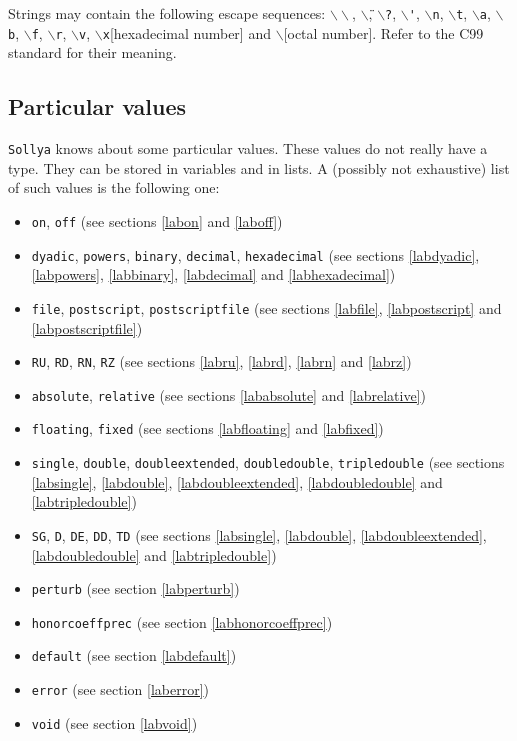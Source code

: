\documentclass[a4paper]{article}
\newcommand{\com}[1]{\texttt{#1}}
\newcommand{\sollya}{\texttt{Sollya}\xspace}
\begin{document}
Strings may contain the following escape sequences:
\texttt{$\backslash\backslash$}, \texttt{$\backslash$\"},
\texttt{$\backslash$?}, \texttt{$\backslash$\'},
\texttt{$\backslash$n}, \texttt{$\backslash$t},
\texttt{$\backslash$a}, \texttt{$\backslash$b},
\texttt{$\backslash$f}, \texttt{$\backslash$r},
\texttt{$\backslash$v}, \texttt{$\backslash$x}[hexadecimal number] and
\texttt{$\backslash$}[octal number]. Refer to the C99 standard for their
meaning.

\subsection{Particular values}
\sollya knows about some particular values. These values do not really have a type. They can be stored in variables and in lists. A (possibly not exhaustive) list of such values is the following one:

\begin{itemize}
\item \com{on}, \com{off} (see sections \ref{labon} and \ref{laboff})
\item \com{dyadic}, \com{powers}, \com{binary}, \com{decimal}, \com{hexadecimal} (see sections \ref{labdyadic}, \ref{labpowers}, \ref{labbinary}, \ref{labdecimal} and \ref{labhexadecimal})
\item \com{file}, \com{postscript}, \com{postscriptfile} (see sections \ref{labfile}, \ref{labpostscript} and \ref{labpostscriptfile})
\item \com{RU}, \com{RD}, \com{RN}, \com{RZ} (see sections \ref{labru}, \ref{labrd}, \ref{labrn} and \ref{labrz})
\item \com{absolute}, \com{relative} (see sections \ref{lababsolute} and \ref{labrelative})
\item \com{floating}, \com{fixed} (see sections \ref{labfloating} and \ref{labfixed})
\item \com{single}, \com{double}, \com{doubleextended}, \com{doubledouble}, \com{tripledouble} (see sections \ref{labsingle}, \ref{labdouble}, \ref{labdoubleextended}, \ref{labdoubledouble} and \ref{labtripledouble})
\item \com{SG}, \com{D}, \com{DE}, \com{DD}, \com{TD} (see sections \ref{labsingle}, \ref{labdouble}, \ref{labdoubleextended}, \ref{labdoubledouble} and \ref{labtripledouble})
\item \com{perturb} (see section \ref{labperturb})
\item \com{honorcoeffprec} (see section \ref{labhonorcoeffprec})
\item \com{default} (see section \ref{labdefault})
\item \com{error} (see section \ref{laberror})
\item \com{void} (see section \ref{labvoid})
\end{itemize}
\end{document}
